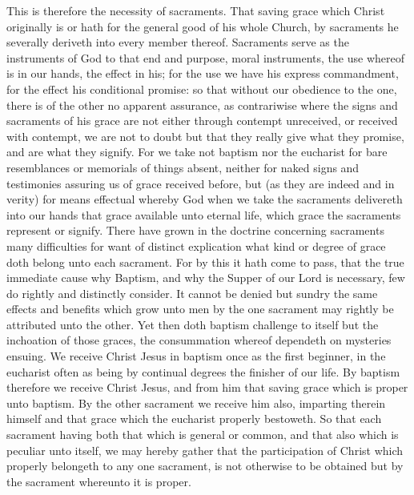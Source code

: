 This is therefore the necessity of sacraments. That saving grace which Christ originally is or hath for the general good of his whole Church, by sacraments he severally deriveth into every member thereof. Sacraments serve as the instruments of God to that end and purpose, moral instruments, the use whereof is in our hands, the effect in his; for the use we have his express commandment, for the effect his conditional promise: so that without our obedience to the one, there is of the other no apparent assurance, as contrariwise where the signs and sacraments of his grace are not either through contempt unreceived, or received with contempt, we are not to doubt but that they really give what they promise, and are what they signify. For we take not baptism nor the eucharist for bare resemblances or memorials of things absent, neither for naked signs and testimonies assuring us of grace received before, but (as they are indeed and in verity) for means effectual whereby God when we take the sacraments delivereth into our hands that grace available unto eternal life, which grace the sacraments represent or signify.
There have grown in the doctrine concerning sacraments many difficulties for want of distinct explication what kind or degree of grace doth belong unto each sacrament. For by  this it hath come to pass, that the true immediate cause why Baptism, and why the Supper of our Lord is necessary, few do rightly and distinctly consider. It cannot be denied but sundry the same effects and benefits which grow unto men by the one sacrament may rightly be attributed unto the other. Yet then doth baptism challenge to itself but the inchoation of those graces, the consummation whereof dependeth on mysteries ensuing. We receive Christ Jesus in baptism once as the first beginner, in the eucharist often as being by continual degrees the finisher of our life. By baptism therefore we receive Christ Jesus, and from him that saving grace which is proper unto baptism. By the other sacrament we receive him also, imparting therein himself and that grace which the eucharist properly bestoweth. So that each sacrament having both that which is general or common, and that also which is peculiar unto itself, we may hereby gather that the participation of Christ which properly belongeth to any one sacrament, is not otherwise to be obtained but by the sacrament whereunto it is proper.

